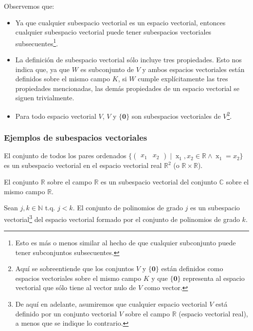 \documentclass[12pt,dvipsnames]{article}
\begin{document}
Observemos que:

\begin{itemize}
    \item Ya que cualquier subespacio vectorial es un espacio vectorial, entonces cualquier subespacio vectorial puede tener subespacios vectoriales subsecuentes\footnote{Esto es más o menos similar al hecho de que cualquier subconjunto puede tener subconjuntos subsecuentes.}.
    \item La definición de subespacio vectorial sólo incluye tres propiedades. Esto nos indica que, ya que $W$ es subconjunto de $V$ y ambos espacios vectoriales están definidos sobre el mismo campo $K$, si $W$ cumple explícitamente las tres propiedades mencionadas, las demás propiedades de un espacio vectorial se siguen trivialmente.
    \item Para todo espacio vectorial $V$, $V$ y $\{\mathbf{0}\}$ son subespacios vectoriales de $V$\footnote{Aquí se sobreentiende que los conjuntos $V$ y $\{\mathbf{0}\}$ están definidos como espacios vectoriales sobre el mismo campo $K$ y que $\{\mathbf{0}\}$ representa al espacio vectorial que sólo tiene al vector nulo de $V$ como vector.}.
\end{itemize}{}

\subsubsection{Ejemplos de subespacios vectoriales}

El conjunto de todos los pares ordenados $\{\begin{pmatrix} x_1&x_2\end{pmatrix}\mathop |\mathop x_1,x_2\in\mathbb{R}\mathop\land\mathop x_1=x_2\}$ es un subespacio vectorial en el espacio vectorial real $\mathbb{R}^2$ (o $\mathbb{R}\times \mathbb{R}$).

\vspace{3mm}

El conjunto $\mathbb{R}$ sobre el campo $\mathbb{R}$ es un subespacio vectorial del conjunto $\mathbb{C}$ sobre el mismo campo $\mathbb{R}$.

\vspace{3mm}

Sean $j,k\in\mathbb{N}$ t.q. $j<k$. El conjunto de polinomios de grado $j$ es un subespacio vectorial\footnote{De aquí en adelante, asumiremos que cualquier espacio vectorial $V$ está definido por un conjunto vectorial $V$ sobre el campo $\mathbb{R}$ (espacio vectorial real), a menos que se indique lo contrario.} del espacio vectorial formado por el conjunto de polinomios de grado $k$.
\end{document}
